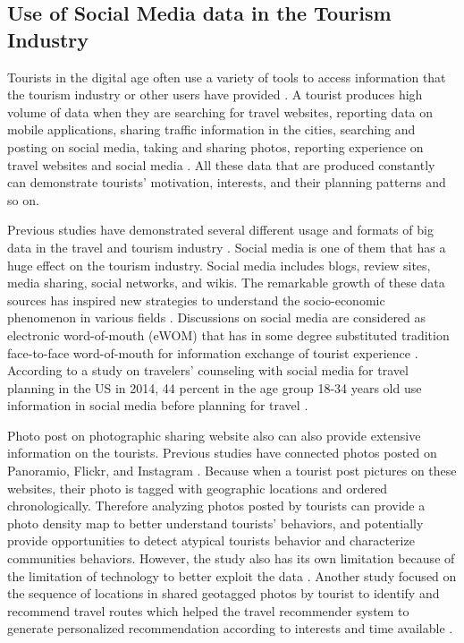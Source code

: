 \documentclass[sigconf]{acmart}
\begin{document}
\subsection{Use of Social Media data in the Tourism Industry}
Tourists in the digital age often use a variety of tools to access information that
the tourism industry or other users have provided \cite{XIANG2015120}. A tourist
produces high volume of data when they are searching for travel websites, reporting
data on mobile applications, sharing traffic information in the cities, searching and
posting on social media, taking and sharing photos, reporting experience on travel
websites and social media \cite{akerkar2012, Shafiee16}. All these data that are
produced constantly can demonstrate tourists' motivation, interests, and their
planning patterns and so on.

Previous studies have demonstrated several different usage and formats of big data in
the travel and tourism industry \cite{XIE2017101}. Social media is one of them that
has a huge effect on the tourism industry. Social media includes blogs, review sites,
media sharing, social networks, and wikis. The remarkable growth of these data sources
has inspired new strategies to understand the socio-economic phenomenon in various
fields \cite{Shafiee16}. Discussions on social media are considered as electronic
word-of-mouth (eWOM) that has in some degree substituted tradition face-to-face
word-of-mouth for information exchange of tourist experience \cite{chung2009}.
According to a study on travelers' counseling with social media for travel planning in
the US in 2014, 44 percent in the age group 18-34 years old use information in social
media before planning for travel \cite{statistica17a}.


Photo post on photographic sharing website also can also provide extensive information
on the tourists. Previous studies have connected photos posted on Panoramio, Flickr,
and Instagram \cite{GJT14, MIAH2017}. Because when a tourist post pictures on these
websites, their photo is tagged with geographic locations and ordered chronologically.
Therefore analyzing photos posted by tourists can provide a photo density map to
better understand tourists' behaviors, and potentially provide opportunities to detect
atypical tourists behavior and characterize communities behaviors. However, the study
also has its own limitation because of the limitation of technology to better exploit
the data \cite{GJT14}. Another study focused on the sequence of locations in shared
geotagged photos by tourist to identify and recommend travel routes which helped the
travel recommender system to generate personalized recommendation according to
interests and time available \cite{kurashima2013travel}. 
\end{document}
